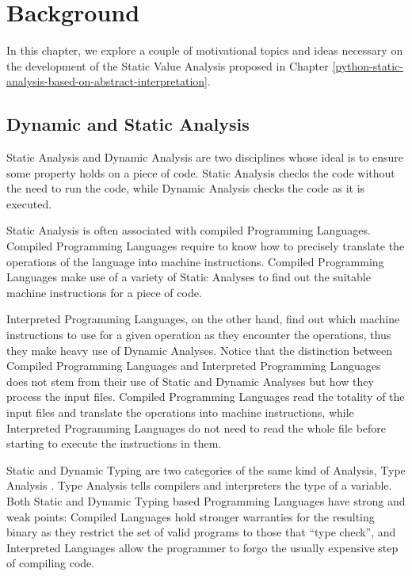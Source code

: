 \documentclass[
11pt, %
english, %
singlespacing, %
headsepline, %
]{MastersDoctoralThesis} %
\begin{document}
\hypertarget{background}{%
\chapter{Background}\label{background}}

In this chapter, we explore a couple of motivational topics and ideas
necessary on the development of the Static Value Analysis proposed in
Chapter \ref{python-static-analysis-based-on-abstract-interpretation}.

\hypertarget{dynamic-and-static-analysis}{%
\section{Dynamic and Static
Analysis}\label{dynamic-and-static-analysis}}

Static Analysis and Dynamic Analysis are two
disciplines{} whose ideal is to ensure some property
holds on a piece of code. Static Analysis checks the code without the
need to run the code, while Dynamic Analysis checks the code as it is
executed.

Static Analysis is often associated with compiled Programming Languages.
Compiled Programming Languages require to know how to precisely
translate the operations of the language into machine instructions.
Compiled Programming Languages make use of a variety of Static Analyses
to find out the suitable machine instructions for a piece of code.

Interpreted Programming Languages, on the other hand, find out which
machine instructions to use for a given operation as they encounter the
operations, thus they make heavy use of Dynamic Analyses. Notice that
the distinction between Compiled Programming Languages and Interpreted
Programming Languages does not stem from their use of Static and Dynamic
Analyses but how they process the input files. Compiled Programming
Languages read the totality of the input files and translate the
operations into machine instructions, while Interpreted Programming
Languages do not need to read the whole file before starting to execute
the instructions in them.

Static and Dynamic Typing are two categories of the same kind of
Analysis, Type Analysis \autocite{pierce_types_2002}. Type Analysis
tells compilers and interpreters the type of a variable. Both Static and
Dynamic Typing based Programming Languages have strong and weak points:
Compiled Languages hold stronger warranties for the resulting binary as
they restrict the set of valid programs to those that \enquote{type
check}, and Interpreted Languages allow the programmer to forgo the
usually expensive step of compiling code.
\end{document}
